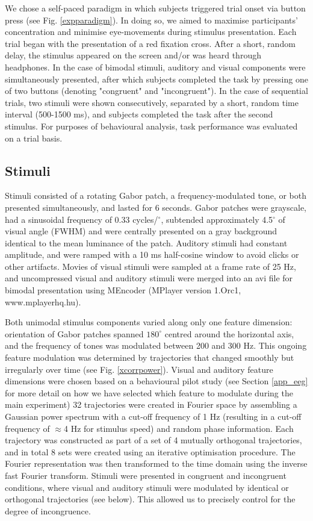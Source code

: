 We chose a self-paced paradigm in which subjects triggered trial onset via
button press (see Fig. \ref{expparadigm}). In doing so, we aimed to
maximise participants' concentration and minimise eye-movements during
stimulus presentation. Each trial began with the presentation of a red
fixation cross. After a short, random delay, the stimulus appeared on the
screen and/or was heard through headphones. In the case of bimodal stimuli,
auditory and visual components were simultaneously presented, after which
subjects completed the task by pressing one of two buttons (denoting
"congruent" and "incongruent"). In the case of sequential trials, two
stimuli were shown consecutively, separated by a short, random time
interval (500-1500 ms), and subjects completed the task after the second
stimulus. For purposes of behavioural analysis, task performance was
evaluated on a trial basis.



\subsection{Stimuli}

Stimuli consisted of a rotating Gabor patch, a frequency-modulated tone, or
both presented simultaneously, and lasted for 6 seconds. Gabor patches were
grayscale, had a sinusoidal frequency of 0.33 cycles/$^\circ$, subtended
approximately 4.5$^\circ$ of visual angle (FWHM) and were centrally
presented on a gray background identical to the mean luminance of the
patch. Auditory stimuli had constant amplitude, and were ramped with a 10
ms half-cosine window to avoid clicks or other artifacts. Movies of visual
stimuli were sampled at a frame rate of 25 Hz, and uncompressed visual and
auditory stimuli were merged into an avi file for bimodal presentation
using MEncoder (MPlayer version 1.Orc1, www.mplayerhq.hu).



Both unimodal stimulus components varied along only one feature dimension:
orientation of Gabor patches spanned $180^\circ$ centred around the
horizontal axis, and the frequency of tones was modulated between 200 and
300 Hz. This ongoing feature modulation was determined by trajectories that
changed smoothly but irregularly over time (see Fig. \ref{xcorrpower}).
Visual and auditory feature dimensions were chosen based on a behavioural
pilot study (see Section \ref{app_eeg} for more detail on how we have
selected which feature to modulate during the main experiment) 32
trajectories were created in Fourier space by assembling a Gaussian power
spectrum with a cut-off frequency of 1 Hz (resulting in a cut-off frequency
of $\approx$4 Hz for stimulus speed) and random phase information. Each
trajectory was constructed as part of a set of 4 mutually orthogonal
trajectories, and in total 8 sets were created using an iterative
optimisation procedure. The Fourier representation was then transformed to
the time domain using the inverse fast Fourier transform. Stimuli were
presented in congruent and incongruent conditions, where visual and
auditory stimuli were modulated by identical or orthogonal trajectories
(see below). This allowed us to precisely control for the degree of
incongruence. 



